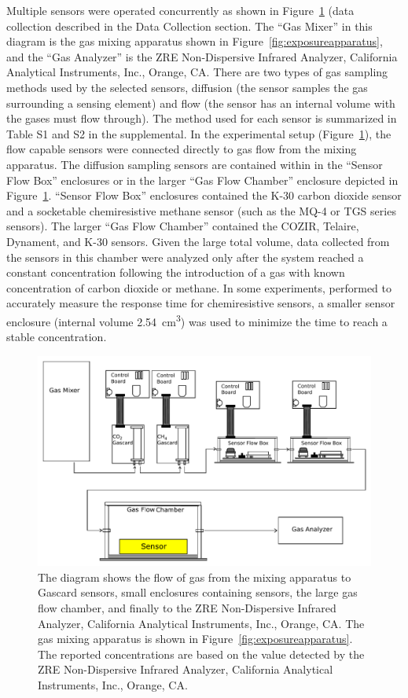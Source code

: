 \documentclass[times]{joehreview}
\begin{document}
	Multiple sensors were operated concurrently as shown in Figure~\ref{fig:exposureapparatus2}  (data collection described in the Data Collection section.  The ``Gas Mixer'' in this diagram is the gas mixing apparatus shown in Figure~\ref{fig:exposureapparatus}, and the ``Gas Analyzer'' is the ZRE Non-Dispersive Infrared Analyzer, California Analytical Instruments, Inc., Orange, CA.  There are two types of gas sampling methods used by the selected sensors, diffusion (the sensor samples the gas surrounding a sensing element) and flow (the sensor has an internal volume with the gases must flow through).  The method used for each sensor is summarized in Table S1 and S2 in the supplemental.  In the experimental setup (Figure~\ref{fig:exposureapparatus2}), the flow capable sensors were connected directly to gas flow from the mixing apparatus.   The diffusion sampling sensors are contained within in the ``Sensor Flow Box'' enclosures or in the larger ``Gas Flow Chamber'' enclosure depicted in Figure~\ref{fig:exposureapparatus2}.  ``Sensor Flow Box'' enclosures contained the K-30 carbon dioxide sensor and a socketable chemiresistive methane sensor (such as the MQ-4 or TGS series sensors).  The larger ``Gas Flow Chamber'' contained the COZIR, Telaire, Dynament, and K-30 sensors.  Given the large total volume, data collected from the sensors in this chamber were analyzed only after the system reached a constant concentration following the introduction of a gas with known concentration of carbon dioxide or methane.  In some experiments, performed to accurately measure the response time for chemiresistive sensors, a smaller sensor enclosure (internal volume \SI{2.54}{\centi\meter\cubed}) was used to minimize the time to reach a stable concentration.
	
	\begin{figure}[!t]
		\centering
		\includegraphics[width=\columnwidth]{honey2.pdf}
		\caption{The diagram shows the flow of gas from the mixing apparatus to Gascard sensors, small enclosures containing sensors, the large gas flow chamber, and finally to the ZRE Non-Dispersive Infrared Analyzer, California Analytical Instruments, Inc., Orange, CA.  The gas mixing apparatus is shown in Figure~\ref{fig:exposureapparatus}.  The reported concentrations are based on the value detected by the ZRE Non-Dispersive Infrared Analyzer, California Analytical Instruments, Inc., Orange, CA.}
		\label{fig:exposureapparatus2}
	\end{figure}
	
\end{document}
